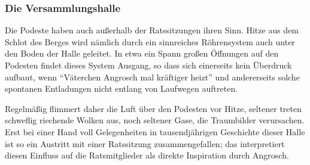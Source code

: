 \subsubsection{Die Versammlungshalle}


Die Podeste haben auch außerhalb der Ratssitzungen ihren Sinn.
Hitze aus dem Schlot des Berges wird nämlich durch ein sinnreiches Röhrensystem auch unter den Boden der Halle geleitet.
In etwa ein Spann großen Öffnungen auf den Podesten findet dieses System Ausgang, so dass sich einerseits kein Überdruck aufbaut,
wenn \enquote{Väterchen Angrosch mal kräftiger heizt} und andererseits solche spontanen Entladungen  nicht entlang von Laufwegen auftreten.

Regelmäßig flimmert daher die Luft über den Podesten vor Hitze, seltener treten schweflig riechende Wolken aus,
noch seltener Gase, die Traumbilder verursachen. Erst bei einer Hand voll Gelegenheiten in tausendjährigen Geschichte dieser Halle ist so ein Austritt mit einer Ratssitzung zusammengefallen;
das \fkv interpretiert diesen Einfluss auf die Ratsmitglieder als direkte Inspiration durch Angrosch.


